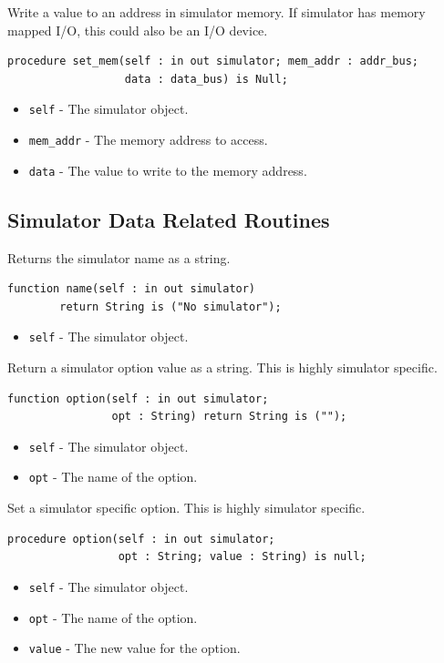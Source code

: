 \documentclass[10pt, openany]{book}
\newcommand{\keyword}[1]{\texttt{#1}}
\begin{document}
Write a value to an address in simulator memory.
If simulator has memory mapped I/O, this could also be an I/O device.
\begin{lstlisting}
procedure set_mem(self : in out simulator; mem_addr : addr_bus;
                  data : data_bus) is Null;
\end{lstlisting}
\begin{itemize}
  \item \keyword{self} - The simulator object.
  \item \keyword{mem\_addr} - The memory address to access.
  \item \keyword{data} - The value to write to the memory address.
\end{itemize}

\subsection{Simulator Data Related Routines}
Returns the simulator name as a string.
\begin{lstlisting}
function name(self : in out simulator)
        return String is ("No simulator");
\end{lstlisting}
\begin{itemize}
  \item \keyword{self} - The simulator object.
\end{itemize}

Return a simulator option value as a string.  This is highly simulator specific.
\begin{lstlisting}
function option(self : in out simulator;
                opt : String) return String is ("");
\end{lstlisting}
\begin{itemize}
  \item \keyword{self} - The simulator object.
  \item \keyword{opt} - The name of the option.
\end{itemize}

Set a simulator specific option.  This is highly simulator specific.
\begin{lstlisting}
procedure option(self : in out simulator;
                 opt : String; value : String) is null;
\end{lstlisting}
\begin{itemize}
  \item \keyword{self} - The simulator object.
  \item \keyword{opt} - The name of the option.
  \item \keyword{value} - The new value for the option.
\end{itemize}
\end{document}
